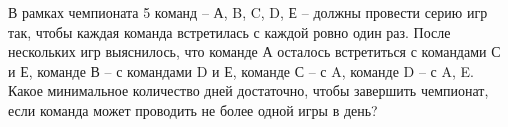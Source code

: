 \question
В рамках чемпионата 5 команд – А, B, C, D, Е – должны провести
серию игр так, чтобы каждая команда встретилась с каждой ровно один раз. После нескольких игр выяснилось, что команде А осталось встретиться с командами  С и Е, команде В – с командами  D и Е, команде С – с A, команде D – с A, E. Какое минимальное количество дней достаточно, чтобы завершить чемпионат, если команда может проводить не более одной игры в день?

